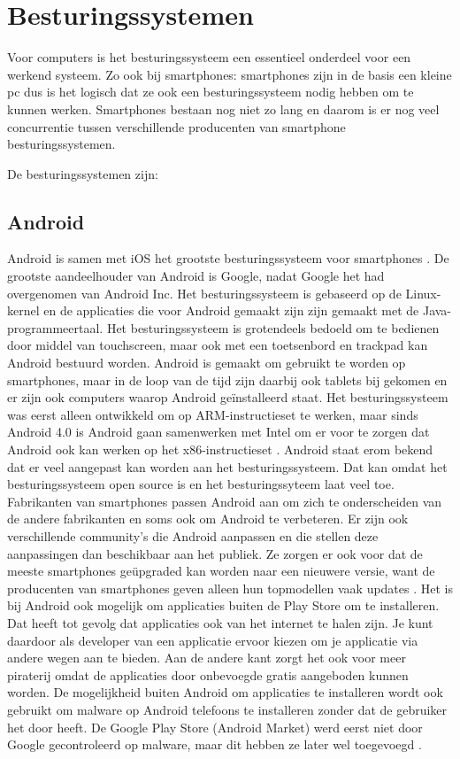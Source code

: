 ﻿\chapter{Besturingssystemen}

Voor computers is het besturingssysteem een essentieel onderdeel voor een werkend systeem.
Zo ook bij smartphones: smartphones zijn in de basis een kleine pc dus is het logisch dat ze ook een besturingssysteem nodig hebben om te kunnen werken.
Smartphones bestaan nog niet zo lang en daarom is er nog veel concurrentie tussen verschillende producenten van smartphone besturingssystemen.

De besturingssystemen zijn:

\section{Android}

Android is samen met iOS het grootste besturingssysteem voor smartphones \citep{canalys}.
De grootste aandeelhouder van Android is Google, nadat Google het had overgenomen van Android Inc.
Het besturingssysteem is gebaseerd op de Linux-kernel en de applicaties die voor Android gemaakt zijn zijn gemaakt met de Java-programmeertaal.
Het besturingssysteem is grotendeels bedoeld om te bedienen door middel van touch\-screen, maar ook met een toetsenbord en trackpad kan Android bestuurd worden.
Android is gemaakt om gebruikt te worden op smartphones, maar in de loop van de tijd zijn daarbij ook tablets bij gekomen en er zijn ook computers waarop Android ge\"installeerd staat.
Het besturingssysteem was eerst alleen ontwikkeld om op ARM-instructieset te werken, maar sinds Android 4.0 is Android gaan samenwerken met Intel om er voor te zorgen dat Android ook kan werken op het x86-instructieset \citep{pcmweb}.
Android staat erom bekend dat er veel aangepast kan worden aan het besturingssysteem.
Dat kan omdat het besturingssysteem open source is en het besturingssyteem laat veel toe.
Fabrikanten van smartphones passen Android aan om zich te onderscheiden van de andere fabrikanten en soms ook om Android te verbeteren.
Er zijn ook verschillende community's die Android aanpassen en die stellen deze aanpassingen dan beschikbaar aan het publiek.
Ze zorgen er ook voor dat de meeste smartphones ge\"upgraded kan worden naar een nieuwere versie, want de producenten van smartphones geven alleen hun topmodellen vaak updates \citep{gsmacties}.
Het is bij Android ook mogelijk om applicaties buiten de Play Store om te installeren.
Dat heeft tot gevolg dat applicaties ook van het internet te halen zijn.
Je kunt daardoor als developer van een applicatie ervoor kiezen om je applicatie via andere wegen aan te bieden.
Aan de andere kant zorgt het ook voor meer piraterij omdat de applicaties door onbevoegde gratis aangeboden kunnen worden.
De mogelijkheid buiten Android om applicaties te installeren wordt ook gebruikt om malware op Android telefoons te installeren zonder dat de gebruiker het door heeft.
De Google Play Store (Android Market) werd eerst niet door Google gecontroleerd op malware, maar dit hebben ze later wel toegevoegd \citep{zdnet}.


